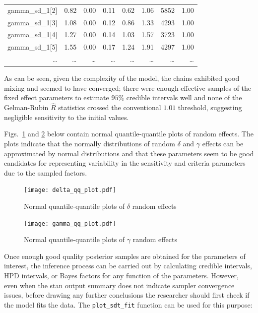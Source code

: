 \documentclass[a4paper,man,apacite,floatsintext]{apa6}
\newcommand{\code}[1]{\texttt{#1}}
\begin{document}
\begin{table}[H]
\begin{tabular}{rrrrrrrr}
  gamma\_sd\_1[2] & 0.82 & 0.00 & 0.11 & 0.62 & 1.06 & 5852 & 1.00 \\ 
  gamma\_sd\_1[3] & 1.08 & 0.00 & 0.12 & 0.86 & 1.33 & 4293 & 1.00 \\ 
  gamma\_sd\_1[4] & 1.27 & 0.00 & 0.14 & 1.03 & 1.57 & 3723 & 1.00 \\ 
  gamma\_sd\_1[5] & 1.55 & 0.00 & 0.17 & 1.24 & 1.91 & 4297 & 1.00 \\ 
  \dots{} & \dots{} & \dots{} & \dots{} & \dots{} & \dots{} & \dots{} & \dots{} \\
  \hline
\end{tabular}
\label{fitsum}
\end{table}

As can be seen, given the complexity of the model, the chains
exhibited good mixing and seemed to have converged; there were enough
effective samples of the fixed effect parameters to estimate $95\%$
credible intervals well and none of the Gelman-Rubin $\hat{R}$
statistics crossed the conventional $1.01$ threshold, suggesting
negligible sensitivity to the initial values.

Figs.~\ref{fig:6} and \ref{fig:7} below contain normal
quantile-quantile plots of random effects. The plots indicate that the
normally distributions of random $\delta$ and $\gamma$ effects can be
approximated by normal distributions and that these parameters seem to
be good candidates for representing variability in the sensitivity and
criteria parameters due to the sampled factors.

\begin{figure}[H]
  \centering
  \texttt{[image: delta\_qq\_plot.pdf]}
  \caption{Normal quantile-quantile plots of $\delta$ random effects}
  \label{fig:6}
\end{figure}

\begin{figure}[H]
  \centering
  \texttt{[image: gamma\_qq\_plot.pdf]}
  \caption{Normal quantile-quantile plots of $\gamma$ random effects}
  \label{fig:7}
\end{figure}

Once enough good quality posterior samples are obtained for the
parameters of interest, the inference process can be carried out by
calculating credible intervals, HPD intervals, or Bayes factors for
any function of the parameters. However, even when the stan output
summary does not indicate sampler convergence issues, before drawing
any further conclusions the researcher should first check if the model
fits the data. The \code{plot\_sdt\_fit} function can be used for this
purpose:
\end{document}
